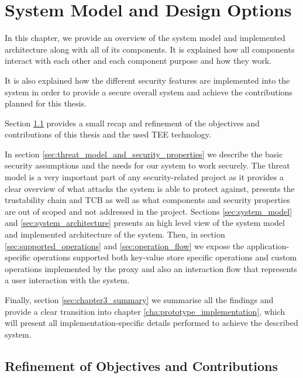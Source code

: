 
\chapter{System Model and Design Options}
\label{cha:system_model_and_design_options}

In this chapter, we provide an overview of the system model and implemented architecture along with all of its components. It is explained how all components interact with each other and each component purpose and how they work.

It is also explained how the different security features are implemented into the system in order to provide a secure overall system and achieve the contributions planned for this thesis.

Section \ref{sec:refinement_of_objectives_and_contributions} provides a small recap and refinement of the objectives and contributions of this thesis and the used \gls{TEE} technology.

In section \ref{sec:threat_model_and_security_properties} we describe the basic security assumptions and the needs for our system to work securely. The threat model is a very important part of any security-related project as it provides a clear overview of what attacks the system is able to protect against, presents the trustability chain and \gls{TCB} as well as what components and security properties are out of scoped and not addressed in the project.
Sections \ref{sec:system_model} and \ref{sec:system_architecture} presents an high level view of the system model and implemented architecture of the system. Then, in section \ref{sec:supported_operations} and \ref{sec:operation_flow} we expose the application-specific operations supported both key-value store specific operations and custom operations implemented by the proxy and also an interaction flow that represents a user interaction with the system.

Finally, section \ref{sec:chapter3_summary} we summarise all the findings and provide a clear transition into chapter \ref{cha:prototype_implementation}, which will present all implementation-specific details performed to achieve the described system.

\section{Refinement of Objectives and Contributions} %
\label{sec:refinement_of_objectives_and_contributions}

